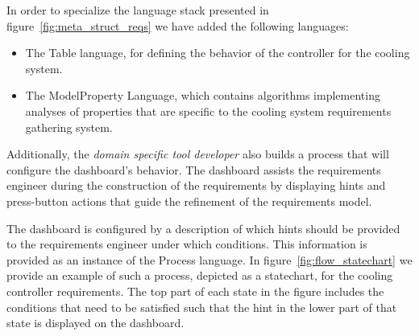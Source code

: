 
In order to specialize the language stack presented in
figure~\ref{fig:meta_struct_reqs} we have added the following languages:


\begin{itemize}
  \item The \textsf{Table} language, for defining the behavior of the
  controller for the cooling system.
  \item The \textsf{ModelProperty} Language, which contains algorithms
  implementing analyses of properties that are specific to the cooling system requirements gathering system.
\end{itemize}

Additionally, the \emph{domain specific tool developer} also builds a process
that will configure the dashboard's behavior. The dashboard assists the requirements engineer during
the construction of the requirements by displaying hints and press-button
actions that guide the refinement of the requirements model.

The dashboard is configured by a description of which hints should be
provided to the requirements engineer under which conditions. This information
is provided as an instance of the \textsf{Process} language.
In figure~\ref{fig:flow_statechart} we provide an example of such a process,
depicted as a statechart, for the	cooling controller requirements.  
The top part of each state in the figure includes the conditions that need to be satisfied such that the hint in the lower part of
that state is displayed on the dashboard. 


